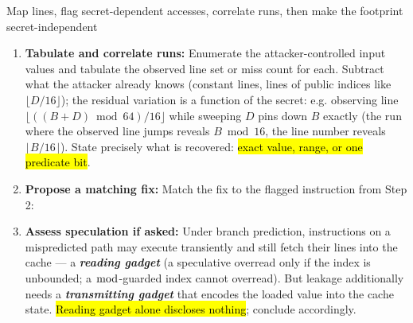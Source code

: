 \documentclass[12pt, a4paper]{article}
\newcommand{\term}[1]{\textbf{\textit{#1}}}        %
\newcommand{\imp}[1]{\hl{#1}}                       %
\begin{document}
\begin{schemebox}{Map lines, flag secret-dependent accesses, correlate runs, then make the footprint secret-independent}
\begin{enumerate}[label=\textbf{Step \arabic*:}, leftmargin=*]
    \term{Access-driven}: assume the attacker flushes/primes the cache before each run and records the set of lines touched (or evicted) after it.
    \item \textbf{Tabulate and correlate runs:} Enumerate the attacker-controlled input values and tabulate the observed line set or miss count for each. Subtract what the attacker already knows (constant lines, lines of public indices like $\lfloor D/16 \rfloor$);
    the residual variation is a function of the secret: e.g. observing line $\lfloor ((B+D) \bmod 64)/16 \rfloor$ while sweeping $D$ pins down $B$ exactly (the run where the observed line jumps reveals $B \bmod 16$, the line number reveals $\lfloor B/16 \rfloor$). State precisely what is recovered: \imp{exact value, range, or one predicate bit}.
    \item \textbf{Propose a matching fix:} Match the fix to the flagged instruction from Step 2:
    \item \textbf{Assess speculation if asked:} Under branch prediction, instructions on a mispredicted path may execute transiently and still fetch their lines into the cache --- a \term{reading gadget} (a speculative overread only if the index is unbounded;
    a $\bmod$-guarded index cannot overread). But leakage additionally needs a \term{transmitting gadget} that encodes the loaded value into the cache state. \imp{Reading gadget alone discloses nothing}; conclude accordingly.
\end{enumerate}
\end{schemebox}
\end{document}
